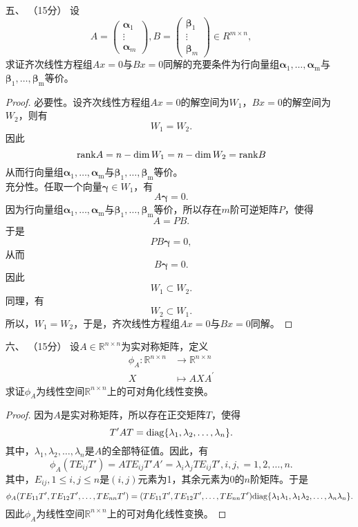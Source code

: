 \begin{enumerate}[1~]
\item[五、]（15分）
设\[
A = \left( \begin{array} { c } { \boldsymbol{\alpha} _ { 1 } } \\ { \vdots } \\ { \boldsymbol{\alpha} _ { m } } \end{array} \right) ,  B = \left( \begin{array} { c } { \boldsymbol{\beta} _ { 1 } } \\ { \vdots } \\ { \boldsymbol{\beta} _ { m } } \end{array} \right) \in R ^ { m \times  n },
\]
求证齐次线性方程组$Ax=0$与$Bx=0$同解的充要条件为行向量组$\boldsymbol{\alpha} _ { 1 } , \dots ,  \boldsymbol{\alpha} _ { \mathrm { m } }$与$\boldsymbol{\beta} _ { 1 } , \dots , \boldsymbol{\beta} _ { \mathrm { m } }$等价。
\begin{proof}
必要性。设齐次线性方程组$Ax=0$的解空间为$W_1$，$Bx=0$的解空间为$W_2$，则有\[
W_1=W_2.
\]
因此\[
{\rm rank}A=n-\dim W_1=n-\dim W_2={\rm rank}B
\]
从而行向量组$\boldsymbol{\alpha} _ { 1 } , \dots ,  \boldsymbol{\alpha} _ { \mathrm { m } }$与$\boldsymbol{\beta} _ { 1 } , \dots , \boldsymbol{\beta} _ { \mathrm { m } }$等价。\\
充分性。任取一个向量$\boldsymbol{\gamma}\in W_1$，有\[
A\boldsymbol{\gamma}=0.
\]
因为行向量组$\boldsymbol{\alpha} _ { 1 } , \dots ,  \boldsymbol{\alpha} _ { \mathrm { m } }$与$\boldsymbol{\beta} _ { 1 } , \dots , \boldsymbol{\beta} _ { \mathrm { m } }$等价，所以存在$m$阶可逆矩阵$P$，使得\[
A=PB.
\]
于是\[
PB\boldsymbol{\gamma}=0,
\]
从而\[
B\boldsymbol{\gamma}=0.
\]
因此\[
W_1\subset W_2.
\]
同理，有\[
W_2\subset W_1.
\]
所以，$W_1=W_2$，于是，齐次线性方程组$Ax=0$与$Bx=0$同解。
\end{proof}

\item[六、]（15分）
设$A \in \mathbb{R} ^ { n \times n }$为实对称矩阵，定义
\begin{align*}
\phi _ { A } : \mathbb{R} ^ { n \times n } &\longrightarrow \mathbb{R} ^ { n \times n } \\
X &\longmapsto  A X A ^ { \prime }
\end{align*}
求证$\phi_{A}$为线性空间$\mathbb{R}^{n\times n}$上的可对角化线性变换。
\begin{proof}
因为$A$是实对称矩阵，所以存在正交矩阵$T$，使得\[
T'AT={\rm diag}\{\lambda_1, \lambda_2, \dots, \lambda_n\}.
\]
其中，$\lambda_1, \lambda_2, \dots, \lambda_n$是$A$的全部特征值。因此，有\[
\phi_A(TE_{ij}T')=ATE_{ij}T'A'=\lambda_i\lambda_j TE_{ij}T', i, j, =1, 2, \dots, n.
\]
其中，$E_{ij}, 1\le i, j\le n$是$(i, j)$元素为1，其余元素为0的$n$阶矩阵。于是\[
\phi_A(TE_{11}T', TE_{12}T', \dots, TE_{nn}T')=(TE_{11}T', TE_{12}T', \dots, TE_{nn}T'){\rm diag}\{\lambda_1\lambda_1, \lambda_1\lambda_2, \dots, \lambda_n\lambda_n\}.
\]
因此$\phi_{A}$为线性空间$\mathbb{R}^{n\times n}$上的可对角化线性变换。
\end{proof}


\end{enumerate}
